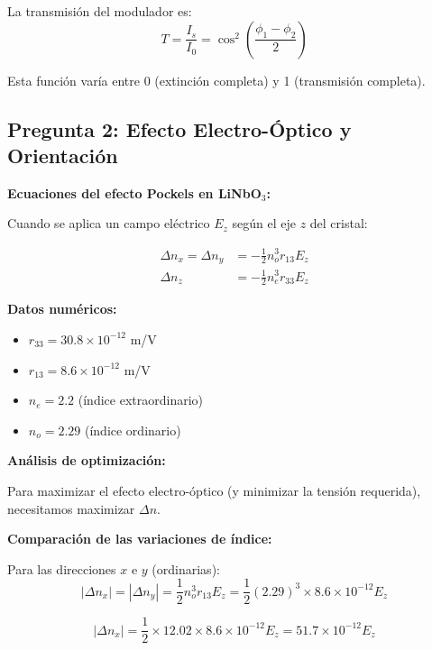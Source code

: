 \documentclass[12pt,a4paper]{article}
\begin{document}
La transmisión del modulador es:
\begin{equation}
    T = \frac{I_s}{I_0} = \cos^2\left(\frac{\phi_1 - \phi_2}{2}\right)
\end{equation}

Esta función varía entre 0 (extinción completa) y 1 (transmisión completa).

\subsection{Pregunta 2: Efecto Electro-Óptico y Orientación}

\textbf{Ecuaciones del efecto Pockels en LiNbO$_3$:}

Cuando se aplica un campo eléctrico $E_z$ según el eje $z$ del cristal:

\begin{align}
    \Delta n_x = \Delta n_y &= -\frac{1}{2} n_o^3 r_{13} E_z \\
    \Delta n_z &= -\frac{1}{2} n_e^3 r_{33} E_z
\end{align}

\textbf{Datos numéricos:}
\begin{itemize}
    \item $r_{33} = 30.8 \times 10^{-12}$ m/V
    \item $r_{13} = 8.6 \times 10^{-12}$ m/V
    \item $n_e = 2.2$ (índice extraordinario)
    \item $n_o = 2.29$ (índice ordinario)
\end{itemize}

\textbf{Análisis de optimización:}

Para maximizar el efecto electro-óptico (y minimizar la tensión requerida), necesitamos maximizar $\Delta n$.

\textbf{Comparación de las variaciones de índice:}

Para las direcciones $x$ e $y$ (ordinarias):
\begin{equation}
    |\Delta n_x| = |\Delta n_y| = \frac{1}{2} n_o^3 r_{13} E_z = \frac{1}{2} (2.29)^3 \times 8.6 \times 10^{-12} E_z
\end{equation}

\begin{equation}
    |\Delta n_x| = \frac{1}{2} \times 12.02 \times 8.6 \times 10^{-12} E_z = 51.7 \times 10^{-12} E_z
\end{equation}
\end{document}
